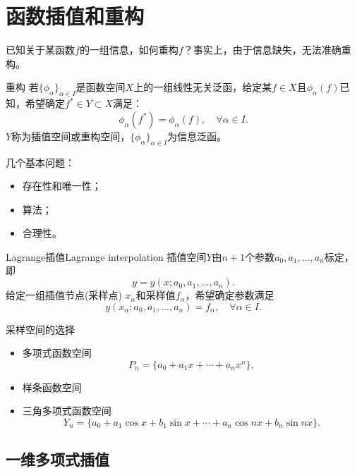 \chapter{函数插值和重构}
\label{chap:interpolation}

已知关于某函数$f$的一组信息，如何重构$f$？事实上，由于信息缺失，无法准确重构。

\begin{definition}
    {重构}{}
    若$\{\phi_\alpha\}_{\alpha\in I}$是函数空间$X$上的一组线性无关泛函，给定某$f\in X$且$\phi_\alpha(f)$已知，希望确定$f^*\in Y\subset X$满足：
    \begin{equation}
        \phi_\alpha(f^*)=\phi_\alpha(f),\quad\forall\alpha\in I.
    \end{equation}
    $Y$称为插值空间或重构空间，$\{\phi_\alpha\}_{\alpha\in I}$为信息泛函。
\end{definition}

几个基本问题：
\begin{itemize}
    \item 存在性和唯一性；
    \item 算法；
    \item 合理性。
\end{itemize}

\begin{definition}
    {Lagrange插值}{Lagrange interpolation}
    插值空间$Y$由$n+1$个参数$a_0,a_1,\ldots,a_n$标定，即
    \[
        y=y(x;a_0,a_1,\ldots,a_n).
    \]
    给定一组插值节点(采样点) $x_\alpha$和采样值$f_\alpha$，希望确定参数满足
    \begin{equation}
        y(x_\alpha;a_0,a_1,\ldots,a_n)=f_\alpha,\quad\forall\alpha\in I.
    \end{equation}
\end{definition}

\begin{example}
    {采样空间的选择}{}
    \begin{itemize}
        \item 多项式函数空间
        \[
            P_n=\{a_0+a_1x+\cdots+a_nx^n\},
        \]
        \item 样条函数空间
        \item 三角多项式函数空间
        \[
            Y_n=\{a_0+a_1\cos x+b_1\sin x+\cdots+a_n\cos nx+b_n\sin nx\}.
        \]
    \end{itemize}
\end{example}

\section{一维多项式插值}
\label{sec:1-D polynomial interpolation}

